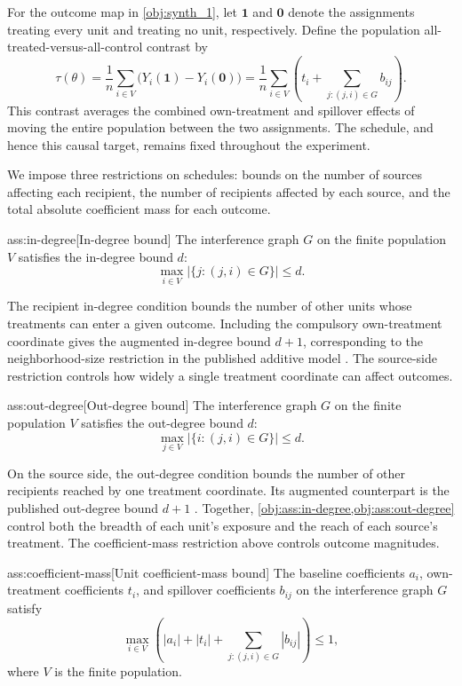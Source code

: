For the outcome map in \cref{obj:synth_1}, let \(\boldsymbol 1\) and \(\boldsymbol 0\) denote the assignments treating every unit and treating no unit, respectively. Define the population all-treated-versus-all-control contrast  by
\[
\tau(\theta)
=
\frac1n\sum_{i\in V}\bigl(Y_i(\boldsymbol 1)-Y_i(\boldsymbol 0)\bigr)
=
\frac1n\sum_{i\in V}
\left(t_i+\sum_{j:(j,i)\in G}b_{ij}\right).
\]
This contrast averages the combined own-treatment and spillover effects of moving the entire population between the two assignments. The schedule, and hence this causal target, remains fixed throughout the experiment.

We impose three restrictions on schedules: bounds on the number of sources affecting each recipient, the number of recipients affected by each source, and the total absolute coefficient mass for each outcome.

\begin{assumptionv}{ass:in-degree}[In-degree bound]
The interference graph \(G\) on the finite population \(V\) satisfies the in-degree bound \(d\):
\[
\max_{i\in V}\bigl|\{j:(j,i)\in G\}\bigr|\le d.
\]
\end{assumptionv}

The recipient in-degree condition bounds the number of other units whose treatments can enter a given outcome. Including the compulsory own-treatment coordinate gives the augmented in-degree bound \(d+1\), corresponding to the neighborhood-size restriction in the published additive model \citep{CortezRodriguezEichhornYu2023SNIPE}. The source-side restriction controls how widely a single treatment coordinate can affect outcomes.

\begin{assumptionv}{ass:out-degree}[Out-degree bound]
The interference graph \(G\) on the finite population \(V\) satisfies the out-degree bound \(d\):
\[
\max_{j\in V}\bigl|\{i:(j,i)\in G\}\bigr|\le d.
\]
\end{assumptionv}

On the source side, the out-degree condition bounds the number of other recipients reached by one treatment coordinate. Its augmented counterpart is the published out-degree bound \(d+1\) \citep{CortezRodriguezEichhornYu2023SNIPE}. Together, \cref{obj:ass:in-degree,obj:ass:out-degree} control both the breadth of each unit's exposure and the reach of each source's treatment. The coefficient-mass restriction above controls outcome magnitudes.

\begin{assumptionv}{ass:coefficient-mass}[Unit coefficient-mass bound]
The baseline coefficients \(a_i\), own-treatment coefficients \(t_i\), and spillover coefficients \(b_{ij}\) on the interference graph \(G\) satisfy
\[
\max_{i\in V}
\left(
|a_i|+|t_i|+\sum_{j:(j,i)\in G}|b_{ij}|
\right)\le 1,
\]
where \(V\) is the finite population.
\end{assumptionv}

